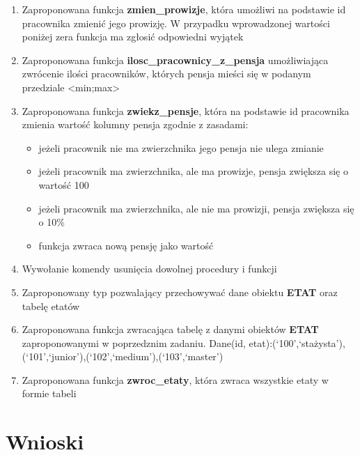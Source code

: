 \documentclass{article}
\begin{document}
\begin{enumerate}
\item Zaproponowana funkcja \textbf{zmien\_prowizje}, która umożliwi na podstawie id pracownika zmienić jego prowizję. W przypadku wprowadzonej wartości poniżej zera funkcja ma zgłosić odpowiedni wyjątek

\item Zaproponowana funkcja \textbf{ilosc\_pracownicy\_z\_pensja} umożliwiająca zwrócenie ilości pracowników, których pensja mieści się w podanym przedziale <min;max>

\item Zaproponowana funkcja \textbf{zwiekz\_pensje}, która na podstawie id pracownika zmienia wartość kolumny pensja zgodnie z zasadami:
\begin{itemize}
\item jeżeli pracownik nie ma zwierzchnika jego pensja nie ulega zmianie
\item jeżeli pracownik ma zwierzchnika, ale ma prowizje, pensja zwiększa się o wartość 100
\item jeżeli pracownik ma zwierzchnika, ale nie ma prowizji, pensja zwiększa się o 10\%
\item funkcja zwraca nową pensję jako wartość
\end{itemize}

\item Wywołanie komendy usunięcia dowolnej procedury i funkcji

\item Zaproponowany typ pozwalający przechowywać dane obiektu \textbf{ETAT} oraz tabelę etatów

\item Zaproponowana funkcja zwracająca tabelę z danymi obiektów \textbf{ETAT} zaproponowanymi w poprzedznim zadaniu. Dane(id, etat):(`100',`stażysta'),(`101',`junior'),(`102',`medium'),(`103',`master')

\item Zaproponowana funkcja \textbf{zwroc\_etaty}, która zwraca wszystkie etaty w formie tabeli
\end{enumerate}

\section{Wnioski}
\end{document}
